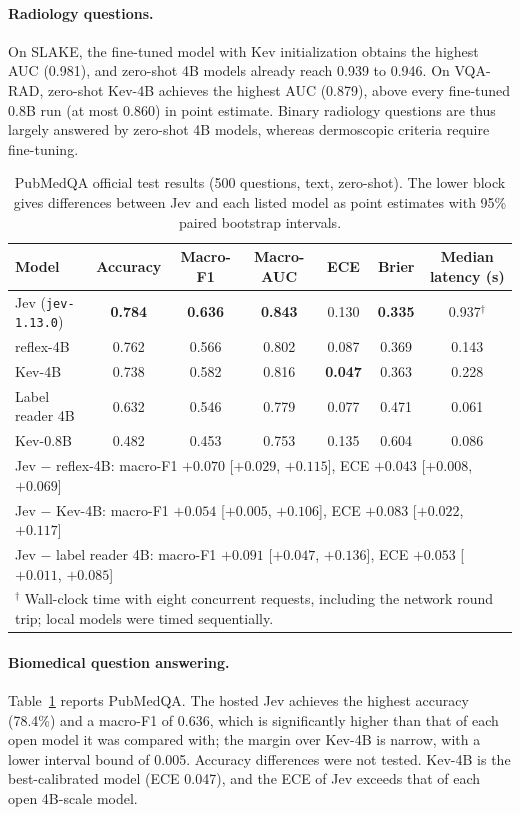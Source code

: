 \documentclass{article}
\begin{document}
\paragraph{Radiology questions.} On SLAKE, the fine-tuned model with Kev initialization obtains the highest AUC (0.981), and zero-shot 4B models already reach 0.939 to 0.946. On VQA-RAD, zero-shot Kev-4B achieves the highest AUC (0.879), above every fine-tuned 0.8B run (at most 0.860) in point estimate. Binary radiology questions are thus largely answered by zero-shot 4B models, whereas dermoscopic criteria require fine-tuning.

\begin{table}[t]
\centering
\caption{PubMedQA official test results (500 questions, text, zero-shot). The lower block gives differences between Jev and each listed model as point estimates with 95\% paired bootstrap intervals.}
\label{tab:pubmedqa}
\small
\begin{tabular}{lcccccc}
\toprule
Model & Accuracy & Macro-F1 & Macro-AUC & ECE & Brier & Median latency (s) \\
\midrule
Jev (\texttt{jev-1.13.0}) & \textbf{0.784} & \textbf{0.636} & \textbf{0.843} & 0.130 & \textbf{0.335} & 0.937$^\dagger$ \\
reflex-4B & 0.762 & 0.566 & 0.802 & 0.087 & 0.369 & 0.143 \\
Kev-4B & 0.738 & 0.582 & 0.816 & \textbf{0.047} & 0.363 & 0.228 \\
Label reader 4B & 0.632 & 0.546 & 0.779 & 0.077 & 0.471 & 0.061 \\
Kev-0.8B & 0.482 & 0.453 & 0.753 & 0.135 & 0.604 & 0.086 \\
\midrule
\multicolumn{7}{l}{Jev $-$ reflex-4B: macro-F1 $+0.070$ [$+0.029$, $+0.115$], ECE $+0.043$ [$+0.008$, $+0.069$]} \\
\multicolumn{7}{l}{Jev $-$ Kev-4B: macro-F1 $+0.054$ [$+0.005$, $+0.106$], ECE $+0.083$ [$+0.022$, $+0.117$]} \\
\multicolumn{7}{l}{Jev $-$ label reader 4B: macro-F1 $+0.091$ [$+0.047$, $+0.136$], ECE $+0.053$ [$+0.011$, $+0.085$]} \\
\bottomrule
\multicolumn{7}{l}{\footnotesize $^\dagger$ Wall-clock time with eight concurrent requests, including the network round trip; local models were timed sequentially.}
\end{tabular}
\end{table}

\paragraph{Biomedical question answering.} Table~\ref{tab:pubmedqa} reports PubMedQA. The hosted Jev achieves the highest accuracy (78.4\%) and a macro-F1 of 0.636, which is significantly higher than that of each open model it was compared with; the margin over Kev-4B is narrow, with a lower interval bound of 0.005. Accuracy differences were not tested. Kev-4B is the best-calibrated model (ECE 0.047), and the ECE of Jev exceeds that of each open 4B-scale model.
\end{document}
